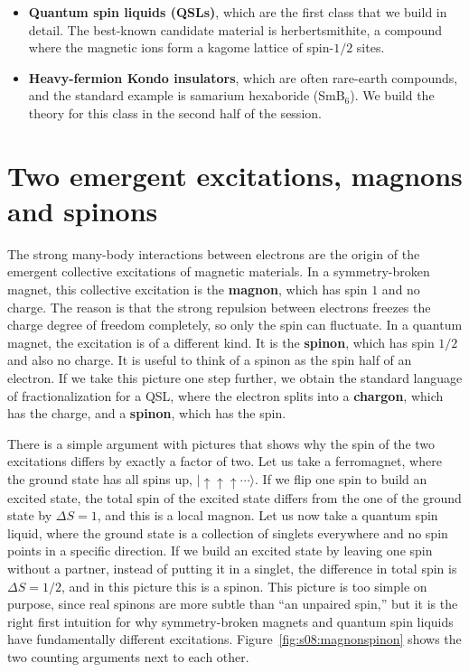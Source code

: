 \begin{itemize}
\item \textbf{Quantum spin liquids (QSLs)}, which are the first class that we build in detail. The
  best-known candidate material is herbertsmithite, a compound where the magnetic ions form a
  kagome lattice of spin-$1/2$ sites.
\item \textbf{Heavy-fermion Kondo insulators}, which are often rare-earth compounds, and the
  standard example is samarium hexaboride (SmB$_6$). We build the theory for this class in the
  second half of the session.
\end{itemize}

\section{Two emergent excitations, magnons and spinons}

The strong many-body interactions between electrons are the origin of the emergent collective
excitations of magnetic materials. In a symmetry-broken magnet, this collective excitation is the
\textbf{magnon}, which has spin $1$ and no charge. The reason is that the strong repulsion between
electrons freezes the charge degree of freedom completely, so only the spin can fluctuate. In a
quantum magnet, the excitation is of a different kind. It is the \textbf{spinon}, which has spin
$1/2$ and also no charge. It is useful to think of a spinon as the spin half of an electron. If we
take this picture one step further, we obtain the standard language of fractionalization for a QSL,
where the electron splits into a \textbf{chargon}, which has the charge, and a \textbf{spinon},
which has the spin.

There is a simple argument with pictures that shows why the spin of the two excitations differs by
exactly a factor of two. Let us take a ferromagnet, where the ground state has all spins up,
$|{\uparrow\uparrow\uparrow\cdots}\rangle$. If we flip one spin to build an excited state, the
total spin of the excited state differs from the one of the ground state by $\Delta S = 1$, and
this is a local magnon. Let us now take a quantum spin liquid, where the ground state is a
collection of singlets everywhere and no spin points in a specific direction. If we build an
excited state by leaving one spin without a partner, instead of putting it in a singlet, the
difference in total spin is $\Delta S = 1/2$, and in this picture this is a spinon. This picture is
too simple on purpose, since real spinons are more subtle than ``an unpaired spin,'' but it
is the right first intuition for why symmetry-broken magnets and quantum spin liquids have
fundamentally different excitations. Figure~\ref{fig:s08:magnonspinon} shows the two counting
arguments next to each other.

